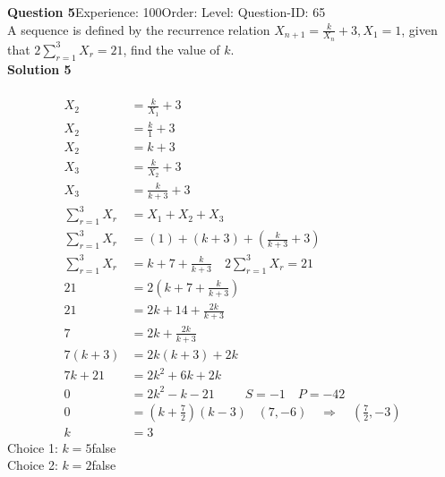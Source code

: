 \documentclass{article}
\begin{document}
\noindent\textbf{Question 5}\hspace{20pt}Experience: 100\hspace{20pt}Order: \hspace{20pt}Level: \hspace{20pt}Question-ID: 65\\[2pt]
A sequence is defined by the recurrence relation $X_{n+1}=\displaystyle\frac{k}{X_n}+3, X_1=1$, given that $2\displaystyle\sum_{r=1}^{3} X_r=21$, find the value of $k$.\\[4pt]
\noindent\textbf{Solution 5}\\[2pt]
\\[-35pt]\begin{align*}
X_2&=\displaystyle\frac{k}{X_1}+3\\[2pt]
X_2&=\displaystyle\frac{k}{1}+3\\[2pt]
X_2&=k+3\\[12pt]
X_3&=\displaystyle\frac{k}{X_2}+3\\[2pt]
X_3&=\displaystyle\frac{k}{k+3}+3\\[12pt]
\displaystyle\sum_{r=1}^{3} X_r&=X_1+X_2+X_3\\[2pt]
\displaystyle\sum_{r=1}^{3} X_r&=(1)+(k+3)+\left(\displaystyle\frac{k}{k+3}+3\right)\\[2pt]
\displaystyle\sum_{r=1}^{3} X_r&=k+7+\displaystyle\frac{k}{k+3}\quad 2\displaystyle\sum_{r=1}^{3} X_r=21\\[2pt]
21&=2\left(k+7+\displaystyle\frac{k}{k+3}\right)\\[2pt]
21&=2k+14+\displaystyle\frac{2k}{k+3}\\[2pt]
7&=2k+\displaystyle\frac{2k}{k+3}\\[2pt]
7(k+3)&=2k(k+3)+2k\\[2pt]
7k+21&=2k^2+6k+2k\\[2pt]
0&=2k^2-k-21\hspace{29pt}S=-1\quad P=-42\\[2pt]
0&=\left(k+\displaystyle\frac{7}{2}\right)(k-3)\hspace{10pt}(7,-6)\quad \Rightarrow \quad \left(\displaystyle\frac{7}{2},-3\right)\\[2pt]
k&=3
\end{align*}
Choice 1: \hspace{20pt}$k=5$\hspace{20pt}false\\
Choice 2: \hspace{20pt}$k=2$\hspace{20pt}false\\
\end{document}
